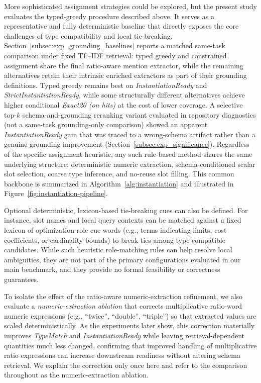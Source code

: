 \documentclass[pdflatex,sn-basic,Numbered]{sn-jnl}
\begin{document}
More sophisticated assignment strategies could be explored, but the present study evaluates the typed-greedy procedure described above. It serves as a representative and fully deterministic baseline that directly exposes the core challenges of type compatibility and local tie-breaking. Section~\ref{subsec:exp_grounding_baselines} reports a matched same-task comparison under fixed TF--IDF retrieval: typed greedy and constrained assignment share the final ratio-aware mention extractor, while the remaining alternatives retain their intrinsic enriched extractors as part of their grounding definitions. Typed greedy remains best on \textit{InstantiationReady} and \textit{StrictInstantiationReady}, while some structurally different alternatives achieve higher conditional \textit{Exact20 (on hits)} at the cost of lower coverage. A selective top-$k$ schema-and-grounding reranking variant evaluated in repository diagnostics (not a same-task grounding-only comparison) showed an apparent \textit{InstantiationReady} gain that was traced to a wrong-schema artifact rather than a genuine grounding improvement (Section~\ref{subsec:exp_significance}). Regardless of the specific assignment heuristic, any such rule-based method shares the same underlying structure: deterministic numeric extraction, schema-conditioned scalar slot selection, coarse type inference, and no-reuse slot filling. This common backbone is summarized in Algorithm~\ref{alg:instantiation} and illustrated in Figure~\ref{fig:instantiation-pipeline}.

Optional deterministic, lexicon-based tie-breaking cues can also be defined. For instance, slot names and local query contexts can be matched against a fixed lexicon of optimization-role cue words (e.g., terms indicating limits, cost coefficients, or cardinality bounds) to break ties among type-compatible candidates. While such heuristic role-matching rules can help resolve local ambiguities, they are not part of the primary configurations evaluated in our main benchmark, and they provide no formal feasibility or correctness guarantees.

To isolate the effect of the ratio-aware numeric-extraction refinement, we also evaluate a \emph{numeric-extraction ablation} that corrects multiplicative ratio-word numeric expressions (e.g., ``twice'', ``double'', ``triple'') so that extracted values are scaled deterministically. As the experiments later show, this correction materially improves \textit{TypeMatch} and \textit{InstantiationReady} while leaving retrieval-dependent quantities much less changed, confirming that improved handling of multiplicative ratio expressions can increase downstream readiness without altering schema retrieval. We explain the correction only once here and refer to the comparison throughout as the numeric-extraction ablation.
\end{document}
